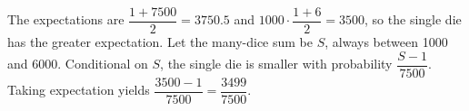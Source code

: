 The expectations are $\dfrac{1+7500}{2}=3750.5$ and $1000\cdot\dfrac{1+6}{2}=3500$, so the single die has the greater expectation. Let the many-dice sum be $S$, always between 1000 and 6000. Conditional on $S$, the single die is smaller with probability $\dfrac{S-1}{7500}$. Taking expectation yields $\boxed{\dfrac{3500-1}{7500}=\dfrac{3499}{7500}}$.
